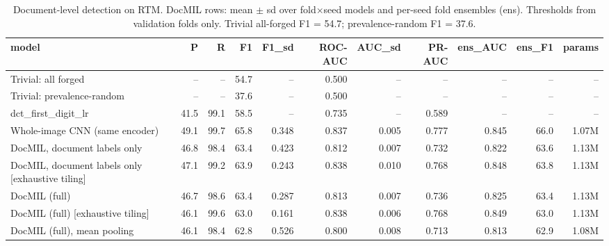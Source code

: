 \begin{table}[t]
\centering
\caption{Document-level detection on RTM. DocMIL rows: mean $\pm$ sd over fold$\times$seed models and per-seed fold ensembles (ens). Thresholds from validation folds only. Trivial all-forged F1 = 54.7; prevalence-random F1 = 37.6.}
\label{tab:rtm_main}
\begin{tabular}{lrrrrrrrrrr}
\toprule
model & P & R & F1 & F1\_sd & ROC-AUC & AUC\_sd & PR-AUC & ens\_AUC & ens\_F1 & params \\
\midrule
Trivial: all forged & -- & -- & 54.7 & -- & 0.500 & -- & -- & -- & -- & -- \\
Trivial: prevalence-random & -- & -- & 37.6 & -- & 0.500 & -- & -- & -- & -- & -- \\
dct\_first\_digit\_lr & 41.5 & 99.1 & 58.5 & -- & 0.735 & -- & 0.589 & -- & -- & -- \\
Whole-image CNN (same encoder) & 49.1 & 99.7 & 65.8 & 0.348 & 0.837 & 0.005 & 0.777 & 0.845 & 66.0 & 1.07M \\
DocMIL, document labels only & 46.8 & 98.4 & 63.4 & 0.423 & 0.812 & 0.007 & 0.732 & 0.822 & 63.6 & 1.13M \\
DocMIL, document labels only [exhaustive tiling] & 47.1 & 99.2 & 63.9 & 0.243 & 0.838 & 0.010 & 0.768 & 0.848 & 63.8 & 1.13M \\
DocMIL (full) & 46.7 & 98.6 & 63.4 & 0.287 & 0.813 & 0.007 & 0.736 & 0.825 & 63.4 & 1.13M \\
DocMIL (full) [exhaustive tiling] & 46.1 & 99.6 & 63.0 & 0.161 & 0.838 & 0.006 & 0.768 & 0.849 & 63.0 & 1.13M \\
DocMIL (full), mean pooling & 46.1 & 98.4 & 62.8 & 0.526 & 0.800 & 0.008 & 0.713 & 0.813 & 62.9 & 1.08M \\
\bottomrule
\end{tabular}
\end{table}